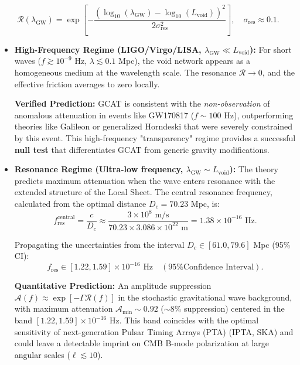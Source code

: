 \documentclass[12pt, a4paper]{article}
\theoremstyle{plain}
\theoremstyle{definition}
\begin{document}
\begin{equation}
\mathcal{R}(\lambda_{\text{GW}}) = \exp\left[-\frac{\left(\log_{10}(\lambda_{\text{GW}}) - \log_{10}(L_{\text{void}})\right)^2}{2\sigma_{\text{res}}^2}\right], \quad \sigma_{\text{res}} \approx 0.1.
\label{eq:resonance_profile}
\end{equation}

\begin{itemize}
    \item \textbf{High-Frequency Regime (LIGO/Virgo/LISA, $\lambda_{\text{GW}} \ll L_{\text{void}}$):} For short waves ($f \gtrsim 10^{-9}$ Hz, $\lambda \lesssim 0.1$ Mpc), the void network appears as a homogeneous medium at the wavelength scale. The resonance $\mathcal{R} \to 0$, and the effective friction averages to zero locally.
    
    \textbf{Verified Prediction:} GCAT is consistent with the \textit{non-observation} of anomalous attenuation in events like GW170817 ($f \sim 100$ Hz), outperforming theories like Galileon or generalized Horndeski that were severely constrained by this event. This high-frequency "transparency" regime provides a successful \textbf{null test} that differentiates GCAT from generic gravity modifications.
    
    \item \textbf{Resonance Regime (Ultra-low frequency, $\lambda_{\text{GW}} \sim L_{\text{void}}$):} The theory predicts maximum attenuation when the wave enters resonance with the extended structure of the Local Sheet. The central resonance frequency, calculated from the optimal distance $D_c = 70.23$ Mpc, is:
    \begin{equation}
    f_{\text{res}}^{\text{central}} = \frac{c}{D_c} \approx \frac{3\times 10^8 \text{ m/s}}{70.23 \times 3.086\times 10^{22} \text{ m}} = 1.38 \times 10^{-16} \text{ Hz}.
    \label{eq:gw_frequency}
    \end{equation}
    
    Propagating the uncertainties from the interval $D_c \in [61.0, 79.6]$ Mpc (95\% CI):
    \begin{equation}
    f_{\text{res}} \in [1.22, 1.59] \times 10^{-16} \text{ Hz} \quad (\text{95\% Confidence Interval}).
    \label{eq:gw_frequency_ci}
    \end{equation}
    
    \textbf{Quantitative Prediction:} An amplitude suppression $\mathcal{A}(f) \approx \exp[-\Gamma \mathcal{R}(f)]$ in the stochastic gravitational wave background, with maximum attenuation $\mathcal{A}_{\min} \sim 0.92$ ($\sim 8\%$ suppression) centered in the band $[1.22, 1.59] \times 10^{-16}$ Hz. This band coincides with the optimal sensitivity of next-generation Pulsar Timing Arrays (PTA) (IPTA, SKA) and could leave a detectable imprint on CMB B-mode polarization at large angular scales ($\ell \lesssim 10$).
    

\end{itemize}
\end{document}
